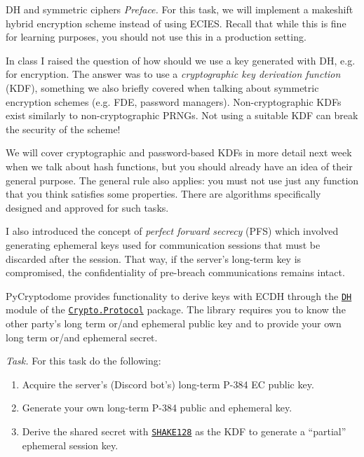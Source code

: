\documentclass{practice}
\begin{document}
\begin{task}{DH and symmetric ciphers}
  \textit{Preface.}
  For this task, we will implement a makeshift hybrid encryption scheme instead of using ECIES.
  Recall that while this is fine for learning purposes, you should not use this in a production setting.

  In class I raised the question of how should we use a key generated with DH, e.g. for encryption.
  The answer was to use a \emph{cryptographic key derivation function} (KDF), something we also briefly covered when talking about symmetric encryption schemes (e.g. FDE, password managers).
  Non-cryptographic KDFs exist similarly to non-cryptographic PRNGs.
  Not using a suitable KDF can break the security of the scheme!

  We will cover cryptographic and password-based KDFs in more detail next week when we talk about hash functions, but you should already have an idea of their general purpose.
  The general rule also applies: you must not use just any function that you think satisfies some properties.
  There are algorithms specifically designed and approved for such tasks.

  I also introduced the concept of \emph{perfect forward secrecy} (PFS) which involved generating ephemeral keys used for communication sessions that must be discarded after the session.
  That way, if the server's long-term key is compromised, the confidentiality of pre-breach communications remains intact.

  PyCryptodome provides functionality to derive keys with ECDH through the \href{https://pycryptodome.readthedocs.io/en/latest/src/protocol/dh.html}{\texttt{DH}} module of the \href{https://pycryptodome.readthedocs.io/en/latest/src/protocol/protocol.html}{\texttt{Crypto.Protocol}} package.
  The library requires you to know the other party's long term or/and ephemeral public key and to provide your own long term or/and ephemeral secret.

  \textit{Task.}
  For this task do the following:
  \begin{enumerate}
    \item Acquire the server's (Discord bot's) long-term P-384 EC public key.
    \item Generate your own long-term P-384 public and ephemeral key.
    \item Derive the shared secret with \href{https://pycryptodome.readthedocs.io/en/latest/src/hash/shake128.html#shake128}{\texttt{SHAKE128}} as the KDF to generate a \enquote{partial} ephemeral session key.
    

\end{enumerate}
\end{task}
\end{document}
